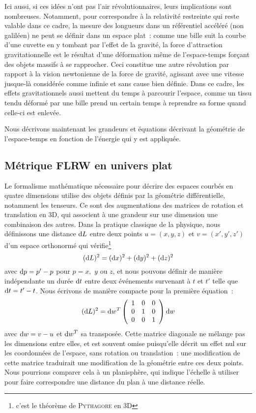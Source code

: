 \documentclass[../main/main.tex]{subfiles}
\begin{document}
Ici aussi, si ces idées n'ont pas l'air révolutionnaires, leurs implications
sont nombreuses. Notamment, pour correspondre à la relativité restreinte qui
reste valable dans ce cadre, la mesure des longueurs dans un référentiel
accéléré (non galiléen) ne peut se définir dans un espace plat~: comme une bille
suit la courbe d'une cuvette en y tombant par l'effet de la gravité, la force
d'attraction gravitationnelle est le résultat d'une déformation même de
l'espace-temps forçant des objets massifs à se rapprocher. Ceci constitue une
autre révolution par rapport à la vision newtonienne de la force de gravité,
agissant avec une vitesse jusque-là considérée comme infinie et sans cause bien
définie. Dans ce cadre, les effets gravitationnels aussi mettent du temps à
parcourir l'espace, comme un tissu tendu déformé par une bille prend un certain
temps à reprendre sa forme quand celle-ci est enlevée.

Nous décrivons maintenant les grandeurs et équations décrivant la géométrie de
l'espace-temps en fonction de l'énergie qui y est appliquée.

\subsection{Métrique FLRW en univers plat}\label{ssec:cons}

Le formalisme mathématique nécessaire pour décrire des espaces courbés en
quatre dimensions utilise des objets définis par la géométrie différentielle,
notamment les tenseurs. Ce sont des augmentations des matrices de rotation et
translation en 3D, qui associent à une grandeur sur une dimension une
combinaison des autres. Dans la pratique classique de la physique, nous
définissons une distance $\mathrm{d} L$ entre deux points $u=(x,y,z)$ et $v=(x',y',z')$
d'un espace orthonormé qui vérifie\footnote{c'est le théorème de
\textsc{Pythagore} en 3D}
\begin{equation}
    (\mathrm{d} L)^2 = (\mathrm{d} x)^2 + (\mathrm{d} y)^2 + (\mathrm{d} z)^2
\end{equation}
avec $\mathrm{d} p = p'-p$ pour $p = x,$ $y$ ou $z$, et nous pouvons définir de manière
indépendante un durée $\mathrm{d} t$ entre deux événements survenant à $t$ et $t'$ telle
que $\mathrm{d} t = t'-t$. Nous écrivons de manière compacte pour la première équation~:
\begin{equation}
    (\mathrm{d} L)^2 = \mathrm{d} w^T\left(\begin{array}{c c c}
            1 & 0 & 0\\
            0 & 1 & 0\\
            0 & 0 & 1\\
    \end{array}\right)\mathrm{d} w
\end{equation}
avec $\mathrm{d} w = v-u$ et $\mathrm{d} w^T$ sa transposée. Cette matrice diagonale ne mélange
pas les dimensions entre elles, et est souvent omise puisqu'elle décrit un effet
nul sur les coordonnées de l'espace, sans rotation ou translation~: une
modification de cette matrice traduirait une modification de la géométrie entre
ces deux points. Nous pourrions comparer cela à un planisphère, qui indique
l'échelle à utiliser pour faire correspondre une distance du plan à une distance
réelle.
\end{document}
